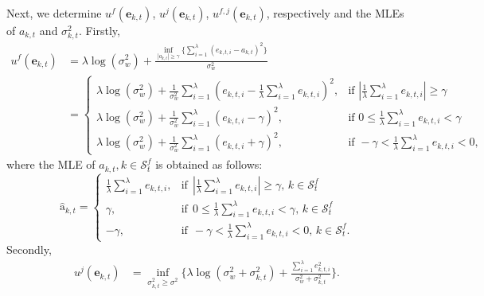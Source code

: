 \documentclass[onecolumn]{IEEEtran}
\def\inf{\mathop{\mathrm{inf}}}
\begin{document}
Next, we determine $u^f(\mathbf{e}_{k,t})$, $u^j(\mathbf{e}_{k,t})$, $u^{f,j}(\mathbf{e}_{k,t})$, respectively and the MLEs of $a_{k,t}$ and $\sigma_{k,t}^2$. Firstly,
\begin{align} \nonumber
u^f(\mathbf{e}_{k,t}) &= \lambda \log(\sigma_w^2) + \frac{\inf_{|a_{k,t}| \geq \gamma} \big\{ \sum_{i=1}^{\lambda} (e_{k,t,i} - a_{k,t})^2 \big\}}{\sigma_w^2} \\  \nonumber
&= \begin{cases}
  \lambda \log(\sigma_w^2) + \frac{1}{\sigma_w^2} \sum_{i=1}^{\lambda} (e_{k,t,i} - \frac{1}{\lambda} \sum_{i=1}^{\lambda} e_{k,t,i})^2 , & \mbox{if } |\frac{1}{\lambda} \sum_{i=1}^{\lambda} e_{k,t,i}| \geq \gamma \\
  \lambda \log(\sigma_w^2) + \frac{1}{\sigma_w^2} \sum_{i=1}^{\lambda} (e_{k,t,i} - \gamma)^2, & \mbox{if } 0 \leq \frac{1}{\lambda} \sum_{i=1}^{\lambda} e_{k,t,i} < \gamma \\
  \lambda \log(\sigma_w^2) + \frac{1}{\sigma_w^2} \sum_{i=1}^{\lambda} (e_{k,t,i} + \gamma)^2, & \mbox{if } -\gamma < \frac{1}{\lambda} \sum_{i=1}^{\lambda} e_{k,t,i} < 0,
\end{cases}
\end{align}
where the MLE of $a_{k,t}, k \in \mathcal{S}_t^f$ is obtained as follows:
\begin{equation} \label{eq:a_hat_kt_v1}
    \hat{\mathrm{a}}_{k,t} =
    \begin{cases}
     \frac{1}{\lambda} \sum_{i=1}^{\lambda} e_{k,t,i} , & \text{if} ~~ |\frac{1}{\lambda} \sum_{i=1}^{\lambda} e_{k,t,i}| \geq \gamma, \, k \in \mathcal{S}_t^f \\
     \gamma , & \text{if} ~~ 0 \leq \frac{1}{\lambda} \sum_{i=1}^{\lambda} e_{k,t,i} < \gamma, \, k \in \mathcal{S}_t^f \\
     - \gamma , & \text{if} ~~ - \gamma < \frac{1}{\lambda} \sum_{i=1}^{\lambda} e_{k,t,i} < 0, \, k \in \mathcal{S}_t^f.
    \end{cases}
\end{equation}
Secondly,
\begin{align} \nonumber
u^j(\mathbf{e}_{k,t}) &= \inf_{\sigma_{k,t}^2 \geq \sigma^2} \Big\{ \lambda \log(\sigma_w^2 + \sigma_{k,t}^2) + \frac{ \sum_{i=1}^{\lambda} e_{k,t,i}^2}{\sigma_w^2 + \sigma_{k,t}^2} \Big\}.
\end{align}
\end{document}
